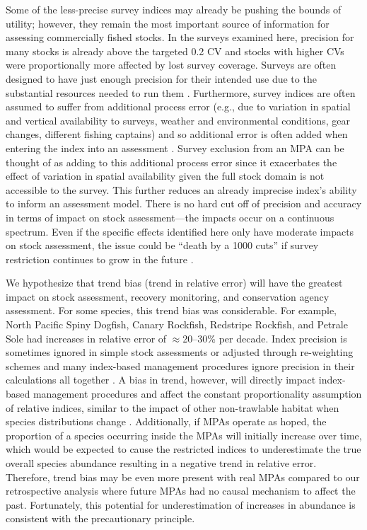 \documentclass[12pt]{article}
\newcommand{\R}[1]{\label{#1}\linelabel{#1}}
\begin{document}
\begin{spacing}{1.4}
Some of the less-precise survey indices may already be pushing the bounds of utility; however, they remain the most important source of information for assessing commercially fished stocks.
In the surveys examined here, precision for many stocks is already above the targeted \citep{sinclair2003syn} 0.2 CV and stocks with higher CVs were proportionally more affected by lost survey coverage.
Surveys are often designed to have just enough precision for their intended use due to the substantial resources needed to run them \citep{hilbornwalters1992}.
Furthermore, survey indices are often assumed to suffer from additional process error \R{E3a} (e.g., due to variation in spatial and vertical availability to surveys, weather and environmental conditions, gear changes, different fishing captains) and so additional error is often added when entering the index into an assessment \citep{pennington1994, francis2003}.
\R{E3b}Survey exclusion from an MPA can be thought of as adding to this additional process error since it exacerbates the effect of variation in spatial availability given the full stock domain is not accessible to the survey.
This further reduces an already imprecise index's ability to inform an assessment model.
There is no hard cut off of precision and accuracy in terms of impact on stock assessment---the impacts occur on a continuous spectrum.
Even if the specific effects identified here only have moderate impacts on stock assessment, the issue could be ``death by a 1000 cuts'' if survey restriction continues to grow in the future \citep{benoit2020national}.

We hypothesize that trend bias (trend in relative error) will have the greatest impact on stock assessment, recovery monitoring, and conservation agency assessment.
For some species, this trend bias was considerable.
For example, North Pacific Spiny Dogfish, Canary Rockfish, Redstripe Rockfish, and Petrale Sole had increases in relative error of $\approx$20--30\% per decade.
Index precision is sometimes ignored in simple stock assessments \citep{free2020} or adjusted through re-weighting schemes \citep{francis2011} and many index-based management procedures ignore precision in their calculations all together \citep{carruthers2016}.
A bias in trend, however, will directly impact index-based management procedures and affect the constant proportionality assumption of relative indices, similar to the impact of other non-trawlable habitat when species distributions change \citep{cordue2007}.
Additionally, if MPAs operate as hoped, the proportion of a species occurring inside the MPAs will initially increase over time, which would be expected to cause the restricted indices to underestimate the true overall species abundance resulting in a negative trend in relative error.
Therefore, trend bias may be even more present with real MPAs compared to our retrospective analysis where future MPAs had no causal mechanism to affect the past.
Fortunately, this potential for underestimation of increases in abundance is consistent with the precautionary principle.


\end{spacing}
\end{document}
